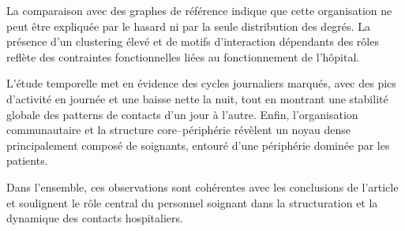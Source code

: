 \documentclass[10pt,twocolumn]{article}
\begin{document}
La comparaison avec des graphes de référence indique que cette organisation
ne peut être expliquée par le hasard ni par la seule distribution des degrés.
La présence d’un clustering élevé et de motifs d’interaction dépendants des rôles
reflète des contraintes fonctionnelles liées au fonctionnement de l’hôpital.

L’étude temporelle met en évidence des cycles journaliers marqués,
avec des pics d’activité en journée et une baisse nette la nuit,
tout en montrant une stabilité globale des patterns de contacts d’un jour à l’autre.
Enfin, l’organisation communautaire et la structure core--périphérie
révèlent un noyau dense principalement composé de soignants,
entouré d’une périphérie dominée par les patients.

Dans l’ensemble, ces observations sont cohérentes avec les conclusions de l’article
et soulignent le rôle central du personnel soignant dans la structuration
et la dynamique des contacts hospitaliers.
\end{document}

